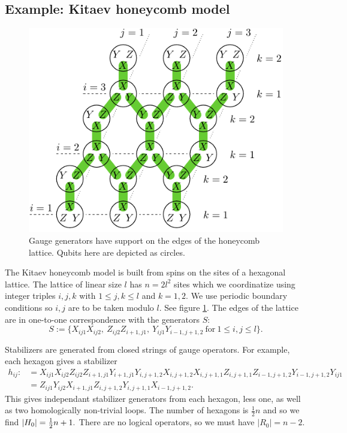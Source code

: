 \documentclass[12pt,notitlepage,longbibliography,nofootinbib,tightenlines]{revtex4}
\begin{document}
\subsection{Example: Kitaev honeycomb model}


\begin{figure}[th!]
\begin{center}
        \includegraphics[width=0.6\columnwidth]{fig_00.pdf}
\caption{
Gauge generators have support on the edges of the honeycomb lattice.
Qubits here are depicted as circles.
}
\label{honeycomb}
\end{center}
\end{figure}


The Kitaev honeycomb model \cite{Kitaev2006} is built from spins on
the sites of a hexagonal lattice. 
The lattice of linear size $l$ has $n=2l^2$ sites
which we coordinatize using integer triples $i, j, k$
with $1\le j, k\le l$ and $k=1, 2.$
We use periodic boundary conditions so $i, j$ are
to be taken modulo $l$.
See figure \ref{honeycomb}.
The edges of the lattice are in one-to-one
correspondence with the generators $S$:
$$
S := \big\{X_{ij1}X_{ij2},\ Z_{ij2}Z_{i+1,j1},\ Y_{ij1}Y_{i-1,j+1,2}
\ \mbox{for}\ 1\le i,j\le l\big\}.
$$

Stabilizers are generated from closed strings of
gauge operators. 
For example, each hexagon gives a stabilizer
\begin{align*}
h_{ij}:&= 
X_{ij1}X_{ij2}
Z_{ij2}Z_{i+1,j1}
Y_{i+1,j1}Y_{i,j+1,2}
X_{i,j+1,2}X_{i,j+1,1}
Z_{i,j+1,1}Z_{i-1,j+1,2}
Y_{i-1,j+1,2}Y_{ij1}
\\
&= 
Z_{ij1} Y_{ij2} X_{i+1,j1}
Z_{i,j+1,2} Y_{i,j+1,1} X_{i-1,j+1,2}.
\end{align*}
This gives independant stabilizer generators
from each hexagon, less one, as well as two
homologically non-trivial loops.
The number of hexagons is $\frac{1}{2}n$ and
so we find $|H_0|=\frac{1}{2} n+1.$
There are no logical operators, so we
must have $|R_0|=n-2.$
\end{document}
